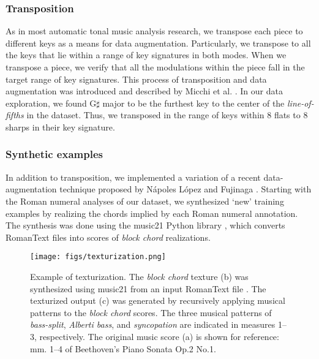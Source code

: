 \documentclass{article}
\newcommand{\guide}[1]{}
\begin{document}
\subsubsection{Transposition}

As in most automatic tonal music analysis research, we transpose each piece to different keys as a means for data augmentation. 
Particularly, we transpose to all the keys that lie within a range of key signatures in both modes.
When we transpose a piece, we verify that all the modulations within the piece fall in the target range of key signatures.
This process of transposition and data augmentation was introduced and described by Micchi et al. \cite{micchi2020not}.
In our data exploration, we found G$\sharp$ major to be the furthest key to the center of the \emph{line-of-fifths} \cite{temperley2000line} in the dataset. 
Thus, we transposed in the range of keys within 8 flats to 8 sharps in their key signature.

\subsubsection{Synthetic examples}

\guide{Additional data augmentation.}
In addition to transposition, we implemented a variation of a recent data-augmentation technique proposed by N\'apoles L\'opez and Fujinaga \cite{napoleslopez2020harmonic}.
Starting with the Roman numeral analyses of our dataset, we synthesized `new' training examples by realizing the chords implied by each Roman numeral annotation.
The synthesis was done using the music21 Python library \cite{cuthbert_music21_2010}, which converts RomanText \cite{gotham2019romantext} files into scores of \emph{block chord} realizations.

\begin{figure}
 \centerline{
 \texttt{[image: figs/texturization.png]}}
 \caption{Example of texturization. The \emph{block chord} texture (b) was synthesized using music21 \cite{cuthbert_music21_2010} from an input RomanText file \cite{gotham2019romantext}. The texturized output (c) was generated by recursively applying musical patterns to the \emph{block chord} scores. The three musical patterns of \emph{bass-split}, \emph{Alberti bass}, and \emph{syncopation} are indicated in measures 1--3, respectively. The original music score (a) is shown for reference: mm. 1--4 of Beethoven's Piano Sonata Op.2 No.1.}
 \label{fig:texturization}
\end{figure}
\end{document}
